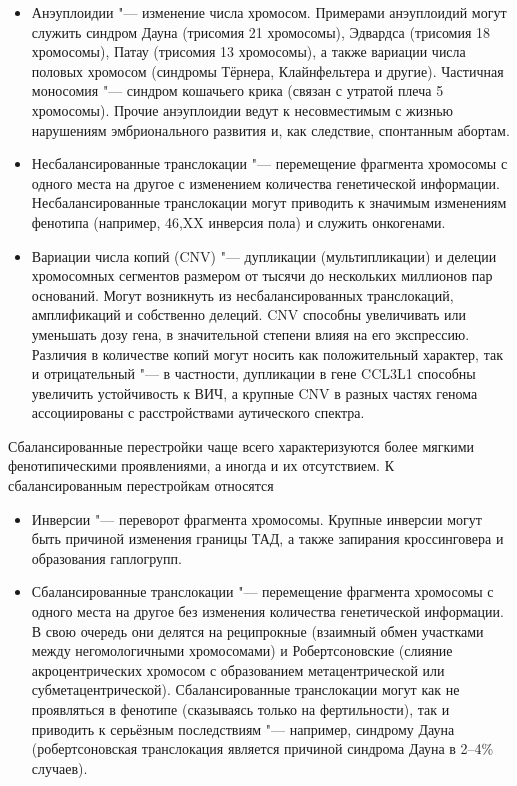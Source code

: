 \documentclass[a4paper,12pt]{article}
\begin{document}
\begin{itemize}
\item Анэуплоидии "--- изменение числа хромосом.
Примерами анэуплоидий могут служить синдром Дауна (трисомия 21 хромосомы), Эдвардса (трисомия 18 хромосомы), Патау (трисомия 13 хромосомы), а также вариации числа половых хромосом (синдромы Тёрнера, Клайнфельтера и другие).
Частичная моносомия "--- синдром кошачьего крика (связан с утратой плеча 5 хромосомы).
Прочие анэуплоидии ведут к несовместимым с жизнью нарушениям эмбрионального развития и, как следствие, спонтанным абортам.
\item Несбалансированные транслокации "--- перемещение фрагмента хромосомы с одного места на другое с изменением количества генетической информации.
Несбалансированные транслокации могут приводить к значимым изменениям фенотипа (например, 46,XX инверсия пола\cite{rizvi}) и служить онкогенами\cite{o-connor}.
\item Вариации числа копий (CNV) "--- дупликации (мультипликации) и делеции хромосомных сегментов размером от тысячи до нескольких миллионов пар оснований.
Могут возникнуть из несбалансированных транслокаций, амплификаций и собственно делеций.
CNV способны увеличивать или уменьшать дозу гена, в значительной степени влияя на его экспрессию.
Различия в количестве копий могут носить как положительный характер, так и отрицательный "--- в частности, дупликации в гене CCL3L1 способны увеличить устойчивость к ВИЧ\cite{gonzalez}, а крупные CNV в разных частях генома ассоциированы с расстройствами аутического спектра\cite{sebat}.
\end{itemize}

Сбалансированные перестройки чаще всего характеризуются более мягкими фенотипическими проявлениями, а иногда и их отсутствием.
К сбалансированным перестройкам относятся

\begin{itemize}
\item Инверсии "--- переворот фрагмента хромосомы.
Крупные инверсии могут быть причиной изменения границы ТАД, а также запирания кроссинговера и образования гаплогрупп.
\item Сбалансированные транслокации "--- перемещение фрагмента хромосомы с одного места на другое без изменения количества генетической информации.
В свою очередь они делятся на реципрокные (взаимный обмен участками между негомологичными хромосомами) и Робертсоновские (слияние акроцентрических хромосом с образованием метацентрической или субметацентрической).
Сбалансированные транслокации могут как не проявляться в фенотипе (сказываясь только на фертильности\cite{dong}), так и приводить к серьёзным последствиям "--- например, синдрому Дауна (робертсоновская транслокация является причиной синдрома Дауна в 2--4\% случаев\cite{asim}).
\end{itemize}
\end{document}

